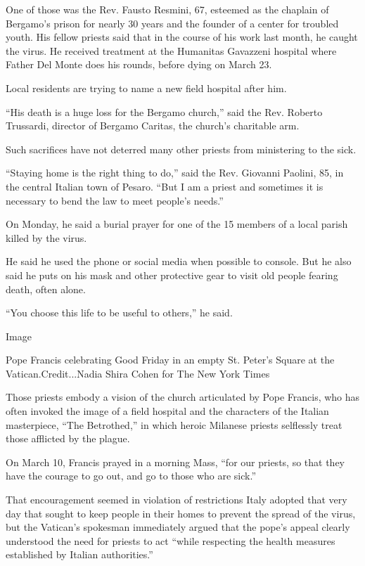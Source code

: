 One of those was the Rev. Fausto Resmini, 67, esteemed as the chaplain
of Bergamo's prison for nearly 30 years and the founder of a center for
troubled youth. His fellow priests said that in the course of his work
last month, he caught the virus. He received treatment at the Humanitas
Gavazzeni hospital where Father Del Monte does his rounds, before dying
on March 23.

Local residents are trying to name a new field hospital after him.

``His death is a huge loss for the Bergamo church,'' said the Rev.
Roberto Trussardi, director of Bergamo Caritas, the church's charitable
arm.

Such sacrifices have not deterred many other priests from ministering to
the sick.

``Staying home is the right thing to do,'' said the Rev. Giovanni
Paolini, 85, in the central Italian town of Pesaro. ``But I am a priest
and sometimes it is necessary to bend the law to meet people's needs.''

On Monday, he said a burial prayer for one of the 15 members of a local
parish killed by the virus.

He said he used the phone or social media when possible to console. But
he also said he puts on his mask and other protective gear to visit old
people fearing death, often alone.

``You choose this life to be useful to others,'' he said.

Image

Pope Francis celebrating Good Friday in an empty St. Peter's Square at
the Vatican.Credit...Nadia Shira Cohen for The New York Times

Those priests embody a vision of the church articulated by Pope Francis,
who has often invoked the image of a field hospital and the characters
of the Italian masterpiece, ``The Betrothed,'' in which heroic Milanese
priests selflessly treat those afflicted by the plague.

On March 10, Francis prayed in a morning Mass, ``for our priests, so
that they have the courage to go out, and go to those who are sick.''

That encouragement seemed in violation of restrictions Italy adopted
that very day that sought to keep people in their homes to prevent the
spread of the virus, but the Vatican's spokesman immediately argued that
the pope's appeal clearly understood the need for priests to act ``while
respecting the health measures established by Italian authorities.''

